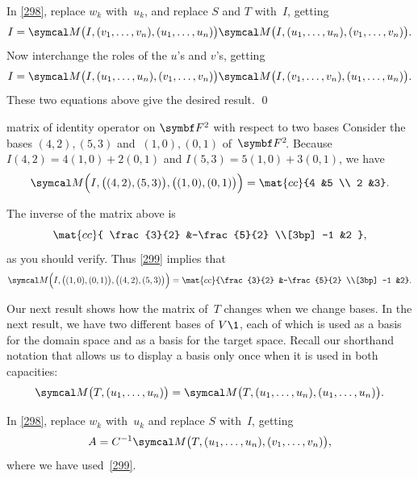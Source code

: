 \proof
In \ref{298}, replace $w_k$ with~$u_k$, and replace
$S$ and $T$ with~$I$, getting
\[
I = \M\bigl(I, (v_1, \dots, v_n), (u_1, \dots, u_n) \bigr)
\M\bigl(I, (u_1, \dots, u_n), (v_1, \dots, v_n) \bigr).
\]
Now interchange the roles of the $u$'s and $v$'s, getting
\[
I = \M\bigl(I, (u_1, \dots, u_n), (v_1, \dots, v_n) \bigr)
\M\bigl(I, (v_1, \dots, v_n), (u_1, \dots, u_n) \bigr).
\]
These two equations above give the desired result.
\qed

\begin{example}{matrix of identity operator on\/ $\F2$ with respect to two bases}
Consider the bases $ (4, 2), (5, 3)$ and $\ (1, 0), (0, 1) $ of~$\FF{2}$. Because $I(4,2) = 4(1,0) + 2(0,1)$ and $I(5, 3) = 5(1,0) + 3(0, 1)$, we have
\[
\M\Bigl(I, \bigl((4, 2), (5, 3)\bigr), \bigl((1, 0), (0, 1)\bigr) \Bigr) =
\mat{cc}{4 &5 \\ 2 &3}.
\]

The inverse of the matrix above is
\[
\mat{cc}{ \frac{3}{2} &-\frac{5}{2} \\[3bp] -1 &2 },
\]
as you should verify.  Thus \ref{299} implies that
\[
\M\Bigl(I, \bigl((1, 0), (0, 1)\bigr), \bigl((4, 2), (5, 3)\bigr) \Bigr) =
\mat{cc}{\frac{3}{2} &-\frac{5}{2} \\[3bp] -1 &2}.
\]
\vspace{-12bp}
\end{example}

Our next result shows how the matrix of~$T$ changes when we change bases. In the next result, we have two different bases of $V\1$, each of which is used as a basis for the domain space and as a basis for the target space. Recall our shorthand notation that allows us to display a basis only once when it is used in both capacities:
\[
\M\bigl(T, (u_1, \dots, u_n)\bigr) = \M\bigl(T, (u_1, \dots, u_n), (u_1, \dots, u_n) \bigr).
\]


\proof
In \ref{298}, replace $w_k$ with~$u_k$ and replace $S$
with~$I$, getting
\begin{equation} \label{300}
A =
C^{-1} \M\bigl(T, (u_1, \dots, u_n), (v_1, \dots, v_n) \bigr),
\end{equation}%
where we have used~\ref{299}.


